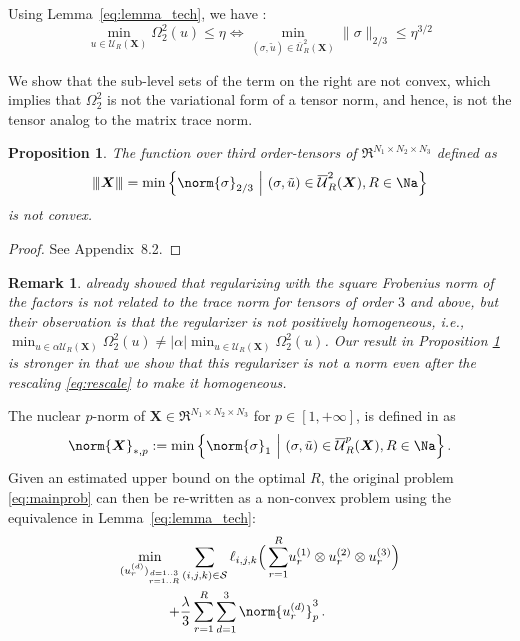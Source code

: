 \documentclass{article}
\newtheorem{proposition}{Proposition}
\newtheorem{remark}{Remark}
\newcommand{\tensor}[1]{{\bm #1}}
\newcommand{\tens}[1]{\tensor{#1}}
\newcommand{\rkv}{r}
\newcommand{\rk}{R}
\newcommand{\dv}{d}
\newcommand{\nents}{N}
\newcommand{\unkn}{X}
\newcommand{\indices}{{\cal S}}
\newcommand{\loss}{\ell}
\newcommand{\npnorm}[1]{\norm{#1}_{*,p}}
\newcommand{\facv}[2]{u^{(#1)}_{#2}}
\newcommand{\allfaccp}{\mathcal{U}_R(\tens{\unkn})}
\newcommand{\nallfaccp}[1]{\overline{\mathcal{U}}^{#1}_R(\tens{\unkn})}
\newcommand{\opnorm}[1]{{\left\vert\kern-0.25ex\left\vert\kern-0.25ex\left\vert #1 
    \right\vert\kern-0.25ex\right\vert\kern-0.25ex\right\vert}}
\begin{document}
Using Lemma~\ref{eq:lemma_tech}, we have :
\begin{equation}
\label{eq:rescale}
\min_{u\in\allfaccp}\Omega_2^2(u) \leq \eta \iff \min_{(\sigma, \tilde{u}) \in \nallfaccp{2}}\lVert \sigma\lVert_{2/3} \leq \eta^{3/2}
\end{equation}

We show that the sub-level sets of the term on the right are not convex, which implies that $\Omega_2^2$ is not the variational form of a tensor norm, and hence, is not the tensor analog to the matrix trace norm.

\begin{proposition}
\label{prop:notanorm}
The function over third order-tensors of  $\Re^{\nents_1 \times \nents_2\times\nents_3}$ defined as
$$\opnorm{\tens{\unkn}} = \min\Big\{ \norm{\sigma}_{2/3}~\Big|~(\sigma, \tilde{u}) \in \nallfaccp{2}, \rk\in\Na\Big\}$$
is not convex.
\end{proposition}
\begin{proof}
See Appendix~8.2.
\end{proof}
\begin{remark}
\citet[Appendix 
D]{cheng_scalable_2016} already showed that regularizing with the square Frobenius norm of the factors is not related to the trace norm for tensors of order $3$ and above, but their observation is that the regularizer is not positively homogeneous, i.e., $\min_{u\in\alpha\allfaccp}\Omega_2^2(u) \neq |\alpha|\min_{u\in\allfaccp}\Omega_2^2(u)$. Our result in Proposition \ref{prop:notanorm} is stronger in that we show that this regularizer is not a norm even after the rescaling \eqref{eq:rescale} to make it homogeneous.
\end{remark}
The nuclear $p$-norm of $\tens{\unkn}\in\Re^{\nents_1\times\nents_2\times\nents_3}$ for $p\in[1, +\infty]$, is defined in \citet{friedland_nuclear_2014} as
\begin{align}
\npnorm{\tens{\unkn}} :=
\min
\Big\{
\norm{\sigma}_1 ~\Big|~ (\sigma, \tilde{u}) \in \nallfaccp{p}, \rk\in\Na
\Big\}\,. \label{eq:npnorm}
\end{align}
Given an estimated upper bound on the optimal $\rk$, the original problem \eqref{eq:mainprob} can then be re-written as a non-convex problem using the equivalence in Lemma~\ref{eq:lemma_tech}:
\begin{align}
\min_{(\facv{\dv}{\rkv})_{
\substack{\scriptscriptstyle \dv=1..3\\\scriptscriptstyle\rkv=1..\rk}}}&
\sum_{(i,j,k)\in\indices}
\loss_{i,j,k}\Big(\sum\limits_{\rkv=1}^\rk \!\facv{1}{\rkv} \otimes \facv{2}{\rkv}\otimes\facv{3}{\rkv}\Big) \\
+ &\frac{\lambda}{3}\sum_{\rkv=1}^\rk \sum_{\dv=1}^3 \norm{\facv{\dv}{\rkv}}_p^3\,. \label{eq:nonconvex}
\end{align}
\end{document}
